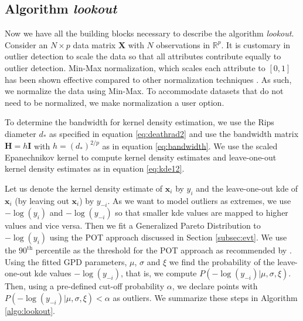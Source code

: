 \documentclass[11pt,a4paper,]{article}
\theoremstyle{definition}
\theoremstyle{definition}
\theoremstyle{definition}
\theoremstyle{remark}
\begin{document}
\hypertarget{algorithm-lookout}{%
\subsection{\texorpdfstring{Algorithm \emph{lookout}}{Algorithm lookout}}\label{algorithm-lookout}}

Now we have all the building blocks necessary to describe the algorithm \emph{lookout}. Consider an \(N \times p\) data matrix \(\bm{X}\) with \(N\) observations in \(\mathbb{R}^p\). It is customary in outlier detection to scale the data so that all attributes contribute equally to outlier detection. Min-Max normalization, which scales each attribute to \([0, 1]\) has been shown effective compared to other normalization techniques \autocite{kandanaarachchi2018normalization}. As such, we normalize the data using Min-Max. To accommodate datasets that do not need to be normalized, we make normalization a user option.

To determine the bandwidth for kernel density estimation, we use the Rips diameter \(d_*\) as specified in equation \eqref{eq:deathrad2} and use the bandwidth matrix \(\bm{H} = h \bm{I}\) with \(h = (d_*)^{2/p}\) as in equation \eqref{eq:bandwidth}. We use the scaled Epanechnikov kernel to compute kernel density estimates and leave-one-out kernel density estimates as in equation \eqref{eq:kde12}.

Let us denote the kernel density estimate of \(\bm{x}_i\) by \(y_i\) and the leave-one-out kde of \(\bm{x}_i\) (by leaving out \(\bm{x}_i\)) by \(y_{-i}\). As we want to model outliers as extremes, we use \(-\log(y_i)\) and \(-\log(y_{-i})\) so that smaller kde values are mapped to higher values and vice versa. Then we fit a Generalized Pareto Distribution to \(-\log(y_i)\) using the POT approach discussed in Section \ref{subsec:evt}. We use the \(90^{\text{th}}\) percentile as the threshold for the POT approach as recommended by \textcite{bommier2014peaks}. Using the fitted GPD parameters, \(\mu\), \(\sigma\) and \(\xi\) we find the probability of the leave-one-out kde values \(-\log(y_{-i})\), that is, we compute \(P\left(-\log(y_{-i})|\mu, \sigma,\xi \right)\). Then, using a pre-defined cut-off probability \(\alpha\), we declare points with \(P\left(-\log(y_{-i})|\mu, \sigma,\xi \right) < \alpha\) as outliers. We summarize these steps in Algorithm \ref{algo:lookout}.
\DontPrintSemicolon
\end{document}
